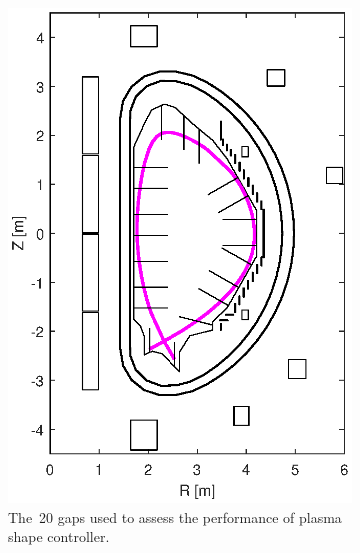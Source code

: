 \begin{figure}[h]
	\centering
	\begin{subfigure}[b]{0.32\textwidth}
		\includegraphics[width=\textwidth] {Chp3/20_gaps.eps}  
		\caption{The~20 gaps used to assess the performance of plasma shape controller.	\label{figure:20_gaps} }
	\end{subfigure}
	~
	\begin{subfigure}[b]{0.32\textwidth}

\end{subfigure}
\end{figure}
